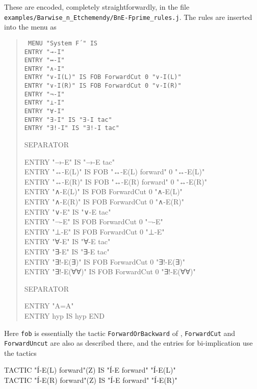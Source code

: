 These are encoded, completely straightforwardly, in the file \texttt{examples/Barwise\_n\_Etchemendy/BnE-Fprime\_rules.j}. The rules are inserted into the menu as
\begin{quote}\tt\small
MENU "System F´" IS\\
\tab ENTRY "→-I" \\
\tab ENTRY "↔-I"\\
\tab ENTRY "∧-I" \\
\tab ENTRY "∨-I(L)" IS FOB ForwardCut 0 "∨-I(L)"\\
\tab ENTRY "∨-I(R)" IS FOB ForwardCut 0 "∨-I(R)"\\
\tab ENTRY "¬-I"\\
\tab ENTRY "⊥-I"\\
\tab ENTRY "∀-I"\\
\tab ENTRY "∃-I" IS "∃-I tac"\\
\tab ENTRY "∃!-I" IS "∃!-I tac"

\tab SEPARATOR

\tab ENTRY "→-E"     IS "→-E tac" \\
\tab ENTRY "↔-E(L)"  IS FOB "↔-E(L) forward" 0 "↔-E(L)" \\
\tab ENTRY "↔-E(R)"  IS FOB "↔-E(R) forward" 0 "↔-E(R)" \\
\tab ENTRY "∧-E(L)"  IS FOB ForwardCut 0 "∧-E(L)"\\
\tab ENTRY "∧-E(R)"  IS FOB ForwardCut 0 "∧-E(R)"\\
\tab ENTRY "∨-E"     IS "∨-E tac"    \\
\tab ENTRY "¬-E"     IS FOB ForwardCut 0 "¬-E"   \\
\tab ENTRY "⊥-E"     IS FOB ForwardCut 0 "⊥-E"   \\
\tab ENTRY "∀-E"     IS "∀-E tac"    \\
\tab ENTRY "∃-E"     IS "∃-E tac"\\
\tab ENTRY "∃!-E(∃)" IS FOB ForwardCut 0 "∃!-E(∃)"\\
\tab ENTRY "∃!-E(∀∀)"    IS FOB ForwardCut 0 "∃!-E(∀∀)"

\tab SEPARATOR

\tab ENTRY "A=A"\\
\tab ENTRY hyp       IS hyp
END
\end{quote}

Here \texttt{fob} is essentially the tactic \texttt{ForwardOrBackward} of , \texttt{ForwardCut} and \texttt{ForwardUncut} are also as described there, and the entries for bi-implication use the tactics

TACTIC "\'{I}-E(L) forward"(Z) IS "\'{I}-E forward" "\'{I}-E(L)"\\
TACTIC "\'{I}-E(R) forward"(Z) IS "\'{I}-E forward" "\'{I}-E(R)"


